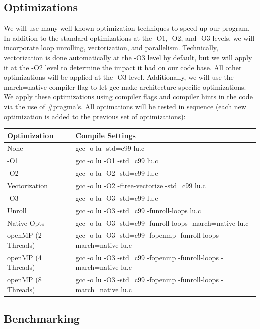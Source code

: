 \documentclass[12]{article}
\begin{document}
\subsection{Optimizations}

We will use many well known optimization techniques to speed up our program.  In addition to the standard optimizations at the -O1, -O2, and -O3 levels, we will incorporate loop unrolling, vectorization, and parallelism.  Technically, vectorization is done automatically at the -O3 level by default, but we will apply it at the -O2 level to determine the impact it had on our code base.  All other optimizations will be applied at the -O3 level.  Additionally, we will use the -march=native compiler flag to let gcc make architecture specific optimizations.  We apply these optimizations using compiler flags and compiler hints in the code via the use of \#pragma's.  All optimations will be tested in sequence (each new optimization is added to the previous set of optimizations):

\begin{center}
\begin{tabular}{|l|l|}
\hline
Optimization & Compile Settings \\
\hline
None & gcc -o lu -std=c99 lu.c \\
-O1 & gcc -o lu -O1  -std=c99 lu.c	 \\
-O2 & gcc -o lu -O2 -std=c99 lu.c \\
Vectorization & gcc -o lu -O2 -ftree-vectorize -std=c99 lu.c \\
-O3 & gcc -o lu -O3 -std=c99 lu.c	 \\
Unroll & gcc -o lu -O3 -std=c99 -funroll-loops lu.c \\
Native Opts & gcc -o lu -O3 -std=c99 -funroll-loops -march=native lu.c \\
openMP (2 Threads) & gcc -o lu -O3 -std=c99 -fopenmp -funroll-loops -march=native lu.c \\
openMP (4 Threads) & gcc -o lu -O3 -std=c99 -fopenmp -funroll-loops -march=native lu.c \\
openMP (8 Threads) & gcc -o lu -O3 -std=c99 -fopenmp -funroll-loops -march=native lu.c \\
\hline
\end{tabular}
\end{center}

\subsection{Benchmarking}
\end{document}
